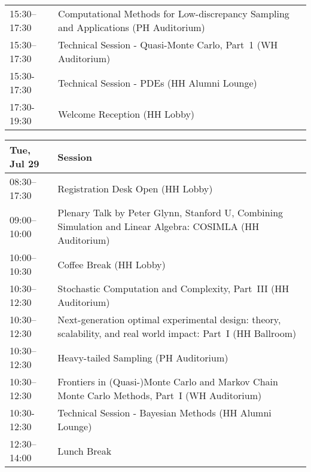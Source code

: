 \begin{table}
{\begin{tabularx}{\textwidth}{>{\hsize=0.32\hsize}X|>{\hsize=1.7\hsize}X}
\cellcolor{\SessionTitleColor}15:30–17:30 & \cellcolor{\SessionTitleColor}Computational Methods for Low-discrepancy Sampling and Applications (PH Auditorium) \\
\cellcolor{\SessionLightColor}15:30–17:30 & \cellcolor{\SessionLightColor}Technical Session - Quasi-Monte Carlo, Part~1 (WH Auditorium) \\
\cellcolor{\SessionLightColor}15:30-17:30 & \cellcolor{\SessionLightColor}Technical Session - PDEs (HH Alumni Lounge) \\
\cellcolor{\EmptyColor}17:30-19:30 & \cellcolor{\EmptyColor}Welcome Reception (HH Lobby) \\
\hline
\end{tabularx}
}
\end{table}

\begin{table}
{\footnotesize
\begin{tabularx}{\textwidth}{>{\hsize=0.32\hsize}X|>{\hsize=1.7\hsize}X}
\hline
\textbf{Tue, Jul 29} & \textbf{Session} \\
\hline
\cellcolor{\EmptyColor}08:30–17:30 & \cellcolor{\EmptyColor}Registration Desk Open (HH Lobby) \\
\cellcolor{\PlenaryColor}09:00–10:00 & \cellcolor{\PlenaryColor}Plenary Talk by Peter Glynn, Stanford U, Combining Simulation and Linear Algebra: COSIMLA (HH Auditorium) \\
\cellcolor{\EmptyColor}10:00–10:30 & \cellcolor{\EmptyColor}Coffee Break (HH Lobby) \\
\cellcolor{\SessionTitleColor}10:30–12:30 & \cellcolor{\SessionTitleColor}Stochastic Computation and Complexity, Part~III (HH Auditorium) \\
\cellcolor{\SessionTitleColor}10:30–12:30 & \cellcolor{\SessionTitleColor}Next-generation optimal experimental design: theory, scalability, and real world impact: Part~I (HH Ballroom) \\
\cellcolor{\SessionTitleColor}10:30–12:30 & \cellcolor{\SessionTitleColor}Heavy-tailed Sampling (PH Auditorium) \\
\cellcolor{\SessionTitleColor}10:30–12:30 & \cellcolor{\SessionTitleColor}Frontiers in (Quasi-)Monte Carlo and Markov Chain Monte Carlo Methods, Part~I (WH Auditorium) \\
\cellcolor{\SessionLightColor}10:30-12:30 & \cellcolor{\SessionLightColor}Technical Session - Bayesian Methods (HH Alumni Lounge) \\
\cellcolor{\EmptyColor}12:30–14:00 & \cellcolor{\EmptyColor}Lunch Break \\

\end{tabularx}}
\end{table}
